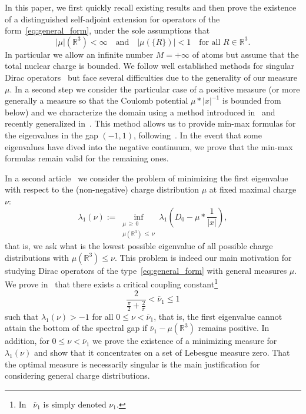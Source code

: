 \documentclass[AHL,Unicode,published]{cedram}
\newcommand{\R}{\mathbb{R}}
\newcommand\1{{\ensuremath {\mathds 1} }}
\newcommand{\ii}{\infty}
\renewcommand{\geq}{\geqslant}
\renewcommand{\leq}{\leqslant}
\begin{document}
In this paper, we first quickly recall existing results and then prove the existence of a distinguished self-adjoint extension for operators of the form~\eqref{eq:general_form}, under the sole assumptions that
\begin{equation}\label{eq:hyp_intro}
|\mu|\left(\R^3\right)<\ii \quad \text{and}\quad \left|\mu(\{R\})\right|<1\quad \text{for all }R\in\R^3.
\end{equation}
In particular we allow an infinite number $M=+\ii$ of atoms but assume that the total nuclear charge is bounded. We follow well established methods for singular Dirac operators~\cite{Kato-83,Klaus-80b,KlaWus-78,Nenciu-76,Nenciu-77,Schmincke-72b,Wust-73,Wust-75,Wust-77} but face several difficulties due to the generality of our measure $\mu$. In a second step we consider the particular case of a positive measure (or more generally a measure so that the Coulomb potential $\mu\ast|x|^{-1}$ is bounded from below) and we characterize the domain using a method introduced in~\cite{EstLos-07, EstLos-08} and recently generalized in~\cite{SchSolTok-20}. This method allows us to provide min-max formulas for the eigenvalues in the gap $(-1,1)$, following~\cite{DolEstSer-00, DolEstSer-00a, DolEstSer-03, DolEstSer-06,EstLewSer-19,GriSie-99, MorMul-15,Muller-16,SchSolTok-20}. In the event that some eigenvalues have dived into the negative continuum, we prove that the min-max formulas remain valid for the remaining ones.

In a second article~\cite{EstLewSer-21b} we consider the problem of minimizing the first eigenvalue with respect to the (non-negative) charge distribution $\mu$ at fixed maximal charge $\nu$:
\[
\lambda_1(\nu):=\inf_{\substack{\mu\,\geq\,0\\
\mu\left(\R^3\right)\,\leq\,\nu}}\lambda_1\left(D_0-\mu\ast\frac1{|x|}\right),
\]
that is, we ask what is the lowest possible eigenvalue of all possible charge distributions with $\mu(\R^3)\leq\nu$. This problem is indeed our main motivation for studying Dirac operators of the type~\eqref{eq:general_form} with general measures $\mu$. We prove in~\cite{EstLewSer-21b} that there exists a critical coupling constant\footnote{In~\cite{EstLewSer-21b} $\overline\nu_1$ is simply denoted $\nu_1$.}
\[
\frac{2}{\frac\pi2+\frac2\pi}<\overline{\nu}_1\leq1
\]
such that $\lambda_1(\nu)>-1$ for all $0\leq \nu<\overline\nu_1$, that is, the first eigenvalue cannot attain the bottom of the spectral gap if $\overline\nu_1-\mu(\R^3)$ remains positive. In addition, for $0\leq\nu<\overline\nu_1$ we prove the existence of a minimizing measure for $\lambda_1(\nu)$ and show that it concentrates on a set of Lebesgue measure zero. That the optimal measure is necessarily singular is the main justification for considering general charge distributions.
\end{document}

